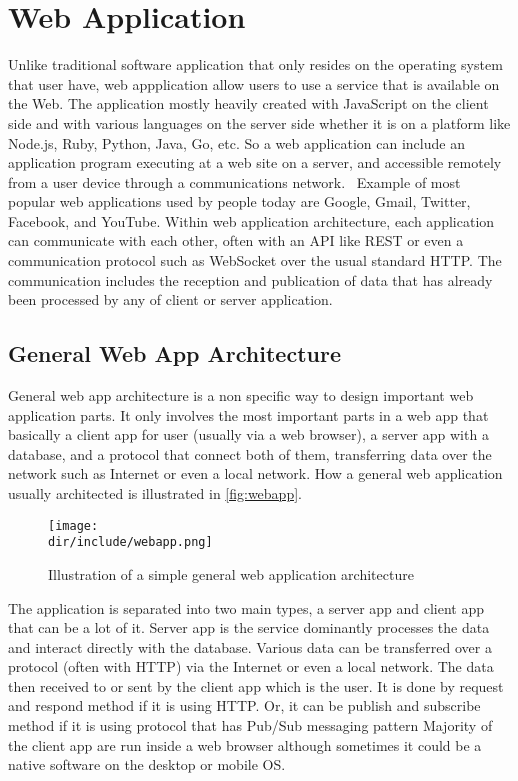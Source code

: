 \section{Web Application}
\label{sec:webapp}

Unlike traditional software application that only resides on the operating system that user have, web appplication allow users to use a service that is available on the Web.
The application mostly heavily created with JavaScript on the client side and with various languages on the server side whether it is on a platform like Node.js, Ruby, Python, Java, Go, etc.
So a web application can include an application program executing at a web site on a server, and accessible remotely from a user device through a communications network.~\autocite{Addala:2013:InteractiveWebAppFramework}
Example of most popular web applications used by people today are Google, Gmail, Twitter, Facebook, and YouTube.
Within web application architecture, each application can communicate with each other, often with an \ac{API} like \ac{REST} or even a communication protocol such as WebSocket over the usual standard \ac{HTTP}.
The communication includes the reception and publication of data that has already been processed by any of client or server application.

\subsection{General Web App Architecture}
\label{ssec:general-webapp-arch}

General web app architecture is a non specific way to design important web application parts.
It only involves the most important parts in a web app that basically a client app for user (usually via a web browser), a server app with a database, and a protocol that connect both of them, transferring data over the network such as Internet or even a local network.
How a general web application usually architected is illustrated in \autoref{fig:webapp}.

\begin{figure}[htbp]
    \centering
    \texttt{[image: \\dir/include/webapp.png]}
    \caption[General Web Application Architecture]{Illustration of a simple general web application architecture}
    \label{fig:webapp}
\end{figure}

The application is separated into two main types, a server app and client app that can be a lot of it.
Server app is the service dominantly processes the data and interact directly with the database.
Various data can be transferred over a protocol (often with \ac{HTTP}) via the Internet or even a local network.
The data then received to or sent by the client app which is the user.
It is done by request and respond method if it is using \ac{HTTP}.
Or, it can be publish and subscribe method if it is using protocol that has \ac{Pub/Sub} messaging pattern
Majority of the client app are run inside a web browser although sometimes it could be a native software on the desktop or mobile \ac{OS}.
